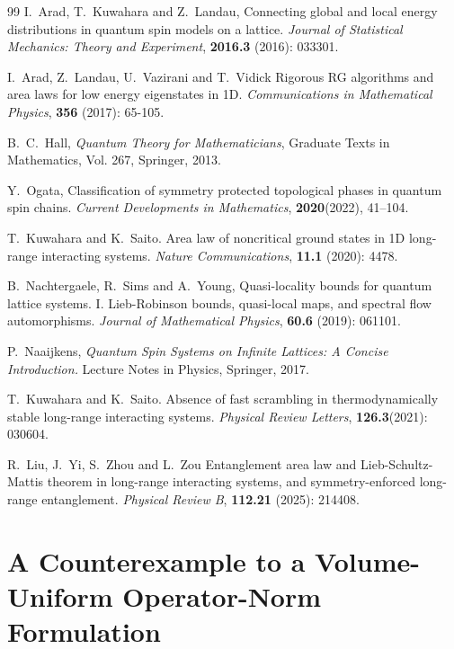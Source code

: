 \documentclass[11pt]{article}
\numberwithin{equation}{section}
\begin{document}
\begin{thebibliography}{99}
I.\ Arad, T.\ Kuwahara and Z.\ Landau,
Connecting global and local energy distributions in quantum spin models on a lattice.
{\it Journal of Statistical Mechanics: Theory and Experiment}, {\bf 2016.3} (2016): 033301.

I.\ Arad, Z.\ Landau, U.\ Vazirani and T.\ Vidick
Rigorous RG algorithms and area laws for low energy eigenstates in 1D.
{\it Communications in Mathematical Physics}, {\bf 356} (2017): 65-105.

B.\ C.\ Hall,
{\it Quantum Theory for Mathematicians},
Graduate Texts in Mathematics, Vol. 267, Springer, 2013.

Y.\ Ogata, 
Classification of symmetry protected topological phases in quantum spin chains.
{\it Current Developments in Mathematics}, {\bf 2020}(2022), 41--104. 

T.\ Kuwahara and K.\ Saito. 
Area law of noncritical ground states in 1D long-range interacting systems.
{\it Nature Communications}, {\bf 11.1} (2020): 4478.

B.\ Nachtergaele, R.\ Sims and A.\ Young, 
Quasi-locality bounds for quantum lattice systems. I. Lieb-Robinson bounds, quasi-local maps, and spectral flow automorphisms.
{\it Journal of Mathematical Physics}, {\bf 60.6} (2019): 061101.

P.\ Naaijkens, 
{\it Quantum Spin Systems on Infinite Lattices: A Concise Introduction.} 
Lecture Notes in Physics, Springer, 2017. 

T.\ Kuwahara and K.\ Saito.
Absence of fast scrambling in thermodynamically stable long-range interacting systems.
{\it Physical Review Letters}, {\bf 126.3}(2021): 030604.

R.\ Liu, J.\ Yi, S.\ Zhou and L.\ Zou
Entanglement area law and Lieb-Schultz-Mattis theorem in long-range interacting systems, and symmetry-enforced long-range entanglement.
{\it Physical Review B}, {\bf 112.21} (2025): 214408.
\end{thebibliography}

\newpage
\appendix
\section{A Counterexample to a Volume-Uniform Operator-Norm Formulation}\label{S_counterexample}
\end{document}
